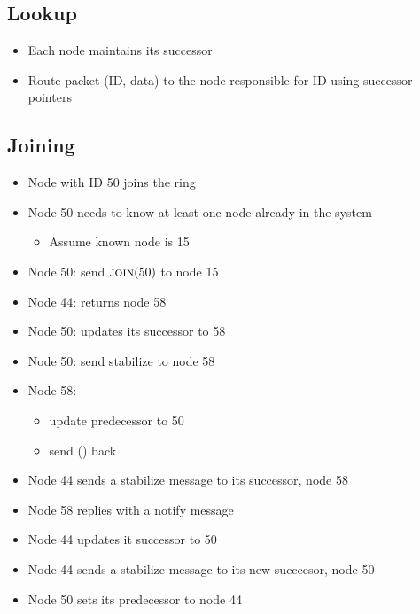 \subsection{Lookup}
\begin{itemize}[nosep]
    \item Each node maintains its successor
    \item Route packet (ID, data) to the node responsible for ID using successor pointers
\end{itemize}

\subsection{Joining}
\begin{itemize}[nosep]
    \item Node with ID 50 joins the ring
    \item Node 50 needs to know at least one node already in the system
          \begin{itemize}[nosep]
              \item Assume known node is 15
          \end{itemize}
    \item Node 50: send $\textproc{join}(50)$ to node 15
    \item Node 44: returns node 58
    \item Node 50: updates its successor to 58
    \item Node 50: send stabilize to node 58
    \item Node 58:
          \begin{itemize}[nosep]
              \item update predecessor to 50
              \item send () back
          \end{itemize}
    \item Node 44 sends a stabilize message to its successor, node 58
    \item Node 58 replies with a notify message
    \item Node 44 updates it successor to 50
    \item Node 44 sends a stabilize message to its new succcesor, node 50
    \item Node 50 sets its predecessor to node 44
\end{itemize}

